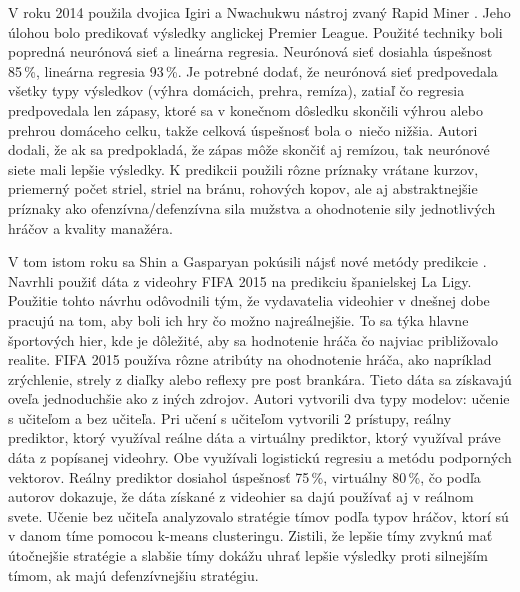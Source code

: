 V roku 2014 použila dvojica Igiri a Nwachukwu nástroj zvaný Rapid Miner \citep{related:igiri}. 
Jeho úlohou bolo predikovať výsledky anglickej Premier League. 
Použité techniky boli popredná neurónová sieť a lineárna regresia. 
Neurónová sieť dosiahla úspešnost 85\,\%, lineárna regresia 93\,\%. 
Je potrebné dodať, že neurónová sieť predpovedala všetky typy výsledkov (výhra domácich, prehra, remíza), zatiaľ čo regresia predpovedala len zápasy, ktoré sa v konečnom dôsledku skončili výhrou alebo prehrou domáceho celku, takže celková úspešnosť bola o~niečo nižšia. 
Autori dodali, že ak sa predpokladá, že zápas môže skončiť aj remízou, tak neurónové siete mali lepšie výsledky. 
K predikcii použili rôzne príznaky vrátane kurzov, priemerný počet striel, striel na bránu, rohových kopov, ale aj abstraktnejšie príznaky ako ofenzívna/defenzívna sila mužstva a ohodnotenie sily jednotlivých hráčov a kvality manažéra.

V tom istom roku sa Shin a Gasparyan pokúsili nájsť nové metódy predikcie \citep{related:shin}. 
Navrhli použiť dáta z videohry FIFA 2015 na pre\-dik\-ciu španielskej La Ligy.
Použitie tohto návrhu odôvodnili tým, že vydavatelia videohier v dnešnej dobe pracujú na tom, aby boli ich hry čo možno najreálnejšie.
To sa týka hlavne športových hier, kde je dôležité, aby sa hodnotenie hráča čo najviac približovalo realite.
FIFA 2015 používa rôzne atribúty na ohodnotenie hráča, ako napríklad zrýchlenie, strely z diaľky alebo reflexy pre post brankára.
Tieto dáta sa získavajú oveľa jednoduchšie ako z iných zdrojov.
Autori vytvorili dva typy modelov: učenie s učiteľom a bez učiteľa.
Pri učení s učiteľom vytvorili 2 prístupy, reálny prediktor, ktorý využíval reálne dáta a virtuálny prediktor, ktorý využíval práve dáta z popísanej videohry.
Obe využívali logistickú regresiu a metódu podporných vektorov.
Reálny prediktor dosiahol úspešnosť 75\,\%, virtuálny 80\,\%, čo podľa autorov dokazuje, že dáta získané z videohier sa dajú používať aj v reálnom svete.
Učenie bez učiteľa analyzovalo stratégie tímov podľa typov hráčov, ktorí sú v danom tíme pomocou k-means clusteringu. Zistili, že lepšie tímy zvyknú mať útočnejšie stratégie a slabšie tímy dokážu uhrať lepšie výsledky proti silnejším tímom, ak majú defenzívnejšiu stratégiu.

